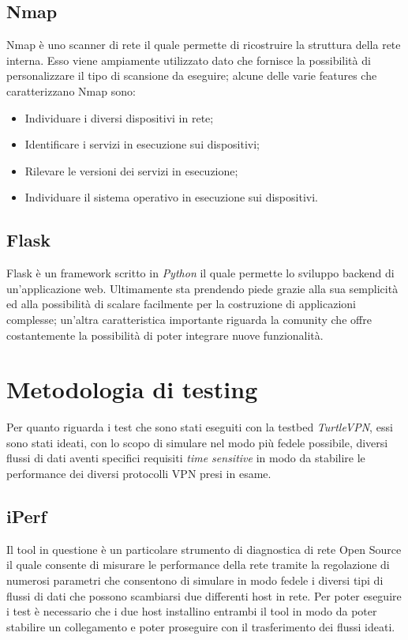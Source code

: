 \subsection{Nmap}
Nmap è uno scanner di rete il quale permette di ricostruire la struttura della rete interna. Esso viene ampiamente utilizzato dato che fornisce la possibilità di personalizzare il tipo di scansione da eseguire; alcune delle varie features che caratterizzano Nmap sono:
\begin{itemize}
    \item Individuare i diversi dispositivi in rete;
    \item Identificare i servizi in esecuzione sui dispositivi;
    \item Rilevare le versioni dei servizi in esecuzione;
    \item Individuare il sistema operativo in esecuzione sui dispositivi.
\end{itemize}

\subsection{Flask}
Flask è un framework scritto in \emph{Python} il quale permette lo sviluppo backend di un'applicazione web. Ultimamente sta prendendo piede grazie alla sua semplicità ed alla possibilità di scalare facilmente per la costruzione di applicazioni complesse; un'altra caratteristica importante riguarda la comunity che offre costantemente la possibilità di poter integrare nuove funzionalità.

\section{Metodologia di testing}
Per quanto riguarda i test che sono stati eseguiti con la testbed \emph{TurtleVPN}, essi sono stati ideati, con lo scopo di simulare nel modo più fedele possibile, diversi flussi di dati aventi specifici requisiti \emph{time sensitive} in modo da stabilire le performance dei diversi protocolli VPN presi in esame. 
\subsection{iPerf}
Il tool in questione è un particolare strumento di diagnostica di rete Open Source il quale consente di misurare le performance della rete tramite la regolazione di numerosi parametri che consentono di simulare in modo fedele i diversi tipi di flussi di dati che possono scambiarsi due differenti host in rete. Per poter eseguire i test è necessario che i due host installino entrambi il tool in modo da poter stabilire un collegamento e poter proseguire con il trasferimento dei flussi ideati.
